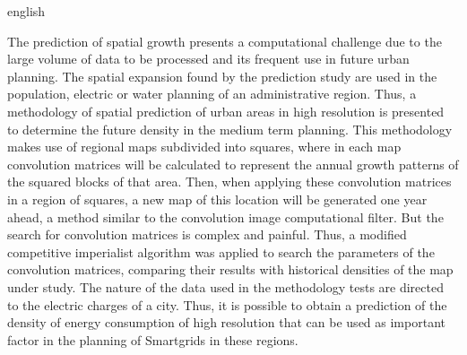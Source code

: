 \begin{resumo}[Abstract]
 \begin{otherlanguage*}{english}

The prediction of spatial growth presents a computational challenge due to the large volume of data to be processed and its frequent use in future urban planning. The spatial expansion found by the prediction study are used in the population, electric or water planning of an administrative region. Thus, a methodology of spatial prediction of urban areas in high resolution is presented to determine the future density in the medium term planning. This methodology makes use of regional maps subdivided into squares, where in each map convolution matrices will be calculated to represent the annual growth patterns of the squared blocks of that area. Then, when applying these convolution matrices in a region of squares, a new map of this location will be generated one year ahead, a method similar to the convolution image computational filter. But the search for convolution matrices is complex and painful. Thus, a modified competitive imperialist algorithm was applied to search the parameters of the convolution matrices, comparing their results with historical densities of the map under study. The nature of the data used in the methodology tests are directed to the electric charges of a city. Thus, it is possible to obtain a prediction of the density of energy consumption of high resolution that can be used as important factor in the planning of Smartgrids in these regions.

 \end{otherlanguage*}
\end{resumo}